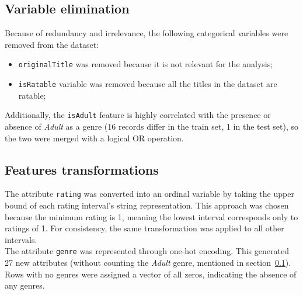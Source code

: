 \subsection{Variable elimination}\label{subsec:var_elim_discrete}
Because of redundancy and irrelevance, the following categorical variables were removed from the dataset:
\begin{itemize}
    \item \texttt{originalTitle} was removed because it is not relevant for the analysis;
    \item \texttt{isRatable} variable was removed because all the titles in the dataset are ratable;
\end{itemize}

Additionally, the \texttt{isAdult} feature is highly correlated with the presence or absence of
\textit{Adult} as a genre (16 records differ in the train set, 1 in the test set), so the two were merged
with a logical OR operation.


\subsection{Features transformations}
The attribute \texttt{rating} was converted into an ordinal variable by taking the upper bound of each rating
interval's string representation. This approach was chosen because the minimum rating is 1, meaning the
lowest interval corresponds only to ratings of 1. For consistency, the same transformation was applied
to all other intervals.\\

The attribute \texttt{genre} was represented through one-hot encoding. This generated 27 new attributes
(without counting the \textit{Adult} genre, mentioned in section~\ref{subsec:var_elim_discrete}).
Rows with no genres were assigned a vector of all zeros, indicating the absence of any genres.\\

